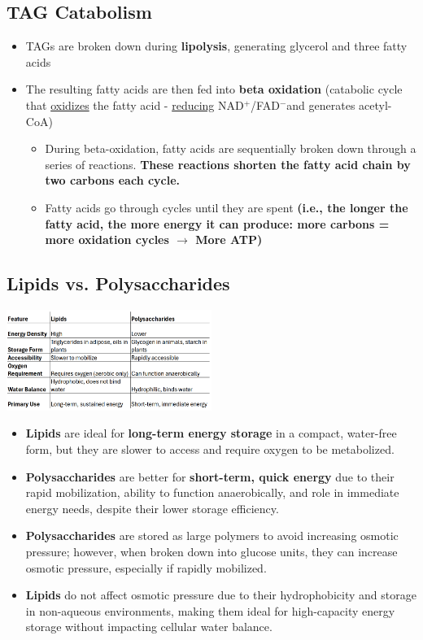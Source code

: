 \documentclass[10pt]{article}
\newcommand{\pc}{$^+$}
\newcommand{\nc}{$^-$}
\begin{document}
\subsection*{TAG Catabolism}
\begin{itemize}
    \item TAGs are broken down during \textbf{lipolysis}, generating glycerol and three fatty acids
    \item The resulting fatty acids are then fed into \textbf{beta oxidation} (catabolic cycle that \underline{oxidizes} the fatty acid - \underline{reducing} NAD\pc/FAD\nc and generates acetyl-CoA)
    \begin{itemize}
        \item During beta-oxidation, fatty acids are sequentially broken down through a series of reactions.  \textbf{These reactions shorten the fatty acid chain by two carbons each cycle.}
        \item Fatty acids go through cycles until they are spent \textbf{(i.e., the longer the fatty acid, the more energy it can produce: more carbons = more oxidation cycles $\rightarrow$ More ATP)}
    \end{itemize}
\end{itemize}

\subsection*{Lipids vs. Polysaccharides}
\begin{center}
    \includegraphics*[width=0.5\textwidth]{L2_15.png}
\end{center}
\begin{itemize}
    \item \textbf{Lipids} are ideal for \textbf{long-term energy storage}  in a compact, water-free form, but they are slower to access and require oxygen to be metabolized.  
    \item \textbf{Polysaccharides} are better for \textbf{short-term, quick energy} due to their rapid mobilization, ability to function anaerobically, and role in immediate energy needs, despite their lower storage efficiency.
\end{itemize}
\begin{itemize}
    \item \textbf{Polysaccharides} are stored as large polymers to avoid increasing osmotic pressure; however, when broken down into glucose units, they can increase osmotic pressure, especially if rapidly mobilized.
    \item \textbf{Lipids} do not affect osmotic pressure due to their hydrophobicity and storage in non-aqueous environments, making them ideal for high-capacity energy storage without impacting cellular water balance.
\end{itemize}
\end{document}
